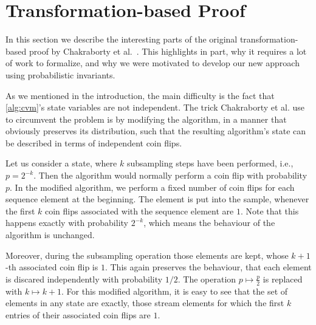 \section{Transformation-based Proof}\label{sec:transformation_based_proof}
In this section we describe the interesting parts of the original transformation-based proof by Chakraborty et al.~\cite{chakraborty2022}.
This highlights in part, why it requires a lot of work to formalize, and why we were motivated to develop our new approach using probabilistic invariants.

As we mentioned in the introduction, the main difficulty is the fact that \cref{alg:cvm}'s state variables are not independent.
The trick Chakraborty et al. use to circumvent the problem is by modifying the algorithm, in a manner that obviously preserves its distribution, such that the resulting algorithm's state can be described in terms of independent coin flips.

Let us consider a state, where $k$ subsampling steps have been performed, i.e., $p = 2^{-k}$. 
Then the algorithm would normally perform a coin flip with probability $p$.
In the modified algorithm, we perform a fixed number of coin flips for each sequence element at the beginning.
The element is put into the sample, whenever the first $k$ coin flips associated with the sequence element are $1$.
Note that this happens exactly with probability $2^{-k}$, which means the behaviour of the algorithm is unchanged.

Moreover, during the subsampling operation those elements are kept, whose $k+1$-th associated coin flip is $1$.
This again preserves the behaviour, that each element is discared independently with probability $1/2$.
The operation $p \mapsto \frac{p}{2}$ is replaced with $k \mapsto k+1$.
For this modified algorithm, it is easy to see that the set of elements in any state are exactly, those stream elements for which the first $k$ entries of their associated coin flips are $1$.

